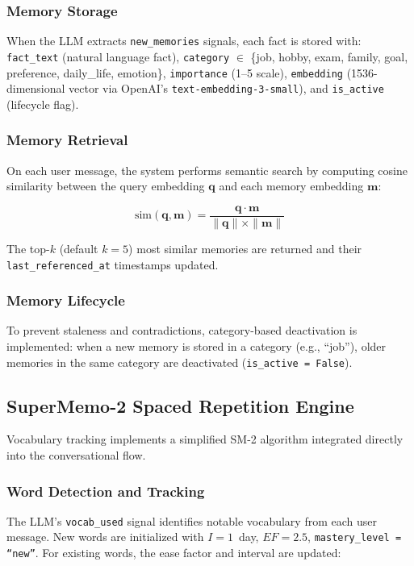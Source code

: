 \documentclass[conference]{IEEEtran}
\begin{document}
\subsubsection{Memory Storage}
When the LLM extracts \texttt{new\_memories} signals, each fact is stored with: \texttt{fact\_text} (natural language fact), \texttt{category} $\in$ \{job, hobby, exam, family, goal, preference, daily\_life, emotion\}, \texttt{importance} (1--5 scale), \texttt{embedding} (1536-dimensional vector via OpenAI's \texttt{text-embedding-3-small}), and \texttt{is\_active} (lifecycle flag).

\subsubsection{Memory Retrieval}
On each user message, the system performs semantic search by computing cosine similarity between the query embedding $\mathbf{q}$ and each memory embedding $\mathbf{m}$:

\begin{equation}
\text{sim}(\mathbf{q}, \mathbf{m}) = \frac{\mathbf{q} \cdot \mathbf{m}}{\|\mathbf{q}\| \times \|\mathbf{m}\|}
\label{eq:cosine}
\end{equation}

The top-$k$ (default $k{=}5$) most similar memories are returned and their \texttt{last\_referenced\_at} timestamps updated.

\subsubsection{Memory Lifecycle}
To prevent staleness and contradictions, category-based deactivation is implemented: when a new memory is stored in a category (e.g., ``job''), older memories in the same category are deactivated (\texttt{is\_active = False}).

\subsection{SuperMemo-2 Spaced Repetition Engine}

Vocabulary tracking implements a simplified SM-2 algorithm integrated directly into the conversational flow.

\subsubsection{Word Detection and Tracking}
The LLM's \texttt{vocab\_used} signal identifies notable vocabulary from each user message. New words are initialized with $I{=}1$~day, $EF{=}2.5$, \texttt{mastery\_level = ``new''}. For existing words, the ease factor and interval are updated:
\end{document}
